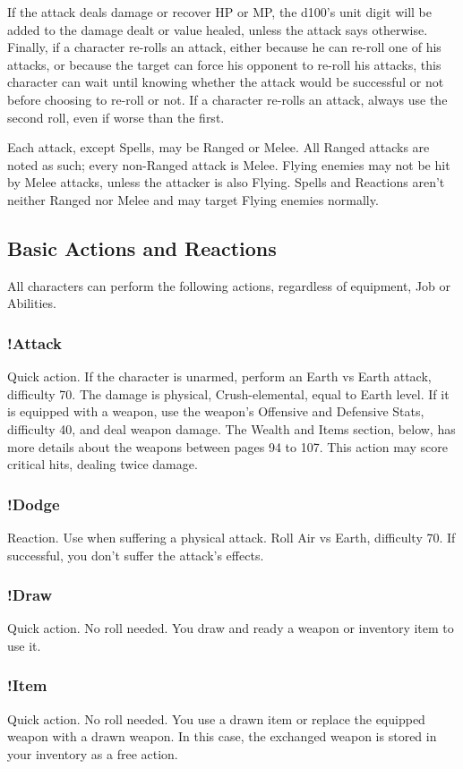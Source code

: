 If the attack deals damage or recover HP or
MP, the d100’s unit digit will be added to the
damage dealt or value healed, unless the attack
says otherwise. Finally, if a character re-rolls an
attack, either because he can re-roll one of his
attacks, or because the target can force his
opponent to re-roll his attacks, this character can
wait until knowing whether the attack would be
successful or not before choosing to re-roll or not.
If a character re-rolls an attack, always use the
second roll, even if worse than the first.

Each attack, except Spells, may be Ranged
or Melee. All Ranged attacks are noted as such;
every non-Ranged attack is Melee. Flying enemies
may not be hit by Melee attacks, unless the
attacker is also Flying. Spells and Reactions aren't
neither Ranged nor Melee and may target Flying
enemies normally.

\subsection{Basic Actions and Reactions}
All characters can perform the following
actions, regardless of equipment, Job or Abilities.

\subsubsection{!Attack}
Quick action. If the character is unarmed,
perform an Earth vs Earth attack, difficulty 70. The
damage is physical, Crush-elemental, equal to
Earth level. If it is equipped with a weapon, use the
weapon’s Offensive and Defensive Stats, difficulty
40, and deal weapon damage. The Wealth and
Items section, below, has more details about the
weapons between pages 94 to 107. This action
may score critical hits, dealing twice damage.

\subsubsection{!Dodge}
Reaction. Use when suffering a physical
attack. Roll Air vs Earth, difficulty 70. If successful,
you don’t suffer the attack’s effects.

\subsubsection{!Draw}
Quick action. No roll needed. You draw and
ready a weapon or inventory item to use it.

\subsubsection{!Item}
Quick action. No roll needed. You use a
drawn item or replace the equipped weapon with
a drawn weapon. In this case, the exchanged
weapon is stored in your inventory as a free action.

